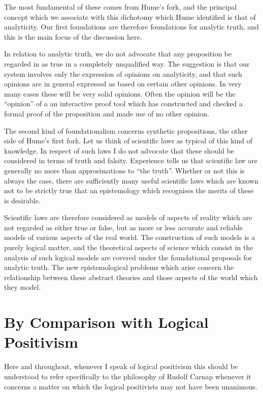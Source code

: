 The most fundamental of these comes from Hume's fork, and the
principal concept which we associate with this dichotomy which Hume
identified is that of analyticity.
Our first foundations are therefore foundations for analytic truth,
and this is the main focus of the discussion here.

In relation to analytic truth, we do not advocate that any proposition
be regarded in as true in a completely unqualified way.
The suggestion is that our system involves only the expression of
opinions on analyticity, and that such opinions are in general
expressed as based on certain other opinions.
In very many cases these will be very solid opinions.
Often the opinion will be the ``opinion'' of a an interactive proof
tool which has constructed and checked a formal proof of the
proposition and made use of no other opinion.

The second kind of foundationalism concerns synthetic propositions,
the other side of Hume's first fork.
Let us think of scientific laws as typical of this kind of knowledge.
In respect of such laws I do not advocate that these should be
considered in terms of truth and falsity.
Experience tells us that scientific law are generally no more than
approsimations to ``the truth''.
Whether or not this is always the case, there are sufficiently many
useful scientific laws which are known not to be strictly true that an
epistemology which recognises the merits of these is desirable.

Scientific laws are therefore considered as models of aspects of
reality which are not regarded as either true or false, but as more or
less accurate and reliable models of various aspects of the real world.
The construction of such models is a purely logical matter, and the
theoretical aspects of science which consist in the analysis of such
logical models are covered under the foundational proposals for
analytic truth.
The new epistemological problems which arise concern the relationship
between these abstract theories and those aspects of the world which
they model.



\section{By Comparison with Logical Positivism}

Here and throughout, whenever I speak of logical positivism this should
be understood to refer specifically to the philosophy of Rudolf Carnap
whenever it concerns a matter on which the logical positivists may not
have been unanimous.

